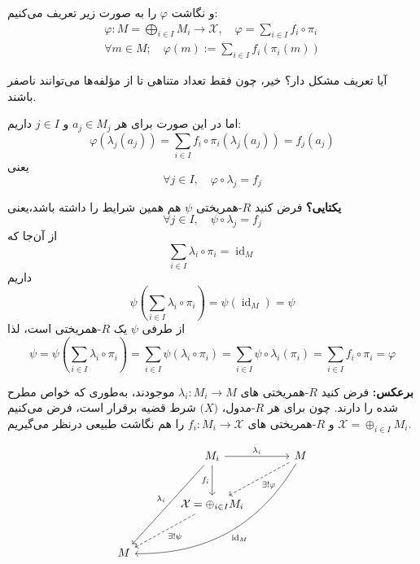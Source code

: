 \begin{frame}
    و نگاشت $\varphi$ را به صورت زیر تعریف می‌کنیم:
    \[
        \begin{aligned}
            \varphi : M = \bigoplus_{i \in I} M_i \to \mathcal{X}, \quad \varphi = \sum_{i \in I} f_i \circ \pi_i \\
            \forall m \in M; \quad \varphi(m) := \sum_{i \in I} f_i(\pi_i(m))
        \end{aligned}
    \]

    آیا تعریف مشکل دار؟
    خیر، چون فقط تعداد متناهی تا از مؤلفه‌ها می‌توانند ناصفر باشند.

    اما در این صورت برای هر $a_j \in M_j$ و $j \in I$ داریم:
    \[
        \varphi  (\lambda_j(a_j))= \sum_{i \in I} f_i \circ \pi_i (\lambda_j(a_j))  = f_j(a_j)
    \]
    یعنی
    \[
        \forall j \in I, \quad \varphi \circ \lambda_j = f_j
    \]
\end{frame}

\begin{frame}
    \textbf{یکتایی؟}
    فرض کنید
    $R$-همریختی
    \(\psi\)
    هم همین شرایط را داشته باشد،‌یعنی
    \[
        \forall j \in I, \quad \psi \circ \lambda_j = f_j
    \]
    از آن‌جا که
    \[
        \sum_{i \in I} \lambda_i \circ \pi_i = \operatorname{id}_M
    \]
    داریم
    \[
        \psi\left( \sum_{i \in I} \lambda_i \circ \pi_i \right) = \psi(\operatorname{id}_M) = \psi
    \]
    از طرفی
    \(\psi\)
    یک
    $R$-همریختی
    است، لذا
    \[
        \psi
        = \psi\left( \sum_{i \in I} \lambda_i \circ \pi_i \right)
        = \sum_{i \in I} \psi (\lambda_i \circ \pi_i)
        = \sum_{i \in I} \psi \circ \lambda_i  (\pi_i)
        = \sum_{i \in I} f_i \circ \pi_i
        = \varphi
    \]
\end{frame}


\begin{frame}
    \textbf{برعکس:}
    فرض کنید
    $R$-همریختی
    های
    \(\lambda_i:M_i\to M\)
    موجودند، به‌طوری که خواص مطرح شده را دارند. چون برای هر
    $R$-مدول،
    \(\mathcal(X)\)
    شرط قضیه برقرار است، فرض می‌کنیم
    \(\mathcal{X} = \oplus_{i\in I}M_i\)
    و
    $R$-همریختی
    های
    \(f_i:M_i\to \mathcal{X}\)
    را هم نگاشت طبیعی درنظر می‌گیریم.

    \large
    \[
        \begin{tikzcd}[column sep=large, row sep=large, ampersand replacement=\&]
            \& M_i \arrow[r, "\lambda_i"] \arrow[ddl, "\lambda_i" swap] \arrow[d, "f_i" swap] \& M \arrow[dashed, dl, "\exists !\varphi"] \arrow[ddll, "\operatorname{id}_M" , bend left]\\
            \& \mathcal{X} = \oplus_{i \in I} M_i \arrow[dashed, dl, "\exists !\psi"]\& \\
            M \& \&
        \end{tikzcd}
    \]


\end{frame}


